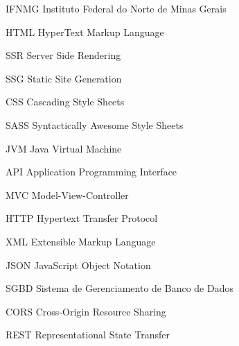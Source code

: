 
\begin{siglas}
  \item[IFNMG] Instituto Federal do Norte de Minas Gerais
  \item[HTML] HyperText Markup Language
  \item[SSR] Server Side Rendering
  \item[SSG] Static Site Generation
  \item[CSS] Cascading Style Sheets
  \item[SASS] Syntactically Awesome Style Sheets
  \item[JVM] Java Virtual Machine
  \item[API] Application Programming Interface
  \item[MVC] Model-View-Controller
  \item[HTTP] Hypertext Transfer Protocol
  \item[XML] Extensible Markup Language
  \item[JSON] JavaScript Object Notation
  \item[SGBD] Sistema de Gerenciamento de Banco de Dados
  \item[CORS] Cross-Origin Resource Sharing
  \item[REST] Representational State Transfer
\end{siglas}